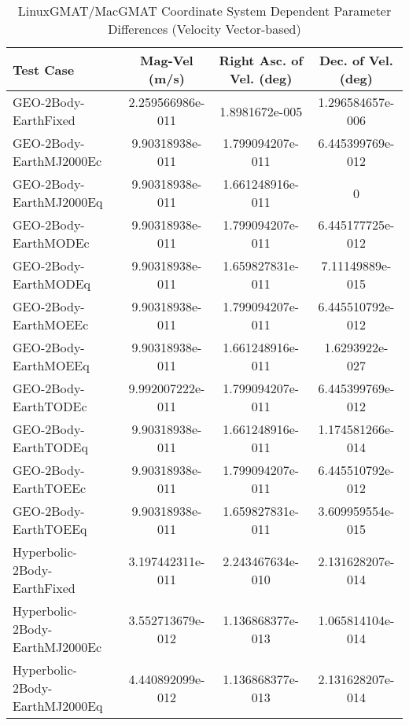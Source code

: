 \begin{table}[htbp!]
\centering
\caption{ LinuxGMAT/MacGMAT Coordinate System Dependent Parameter Differences (Velocity Vector-based)}
      \begin{tabular}{lccc}
      \hline\hline
          Test Case & Mag-Vel (m/s) & Right Asc. of Vel. (deg) & Dec. of Vel. (deg) \\
         \hline
         GEO-2Body-EarthFixed & 2.259566986e-011 & 1.8981672e-005 & 1.296584657e-006 \\
         GEO-2Body-EarthMJ2000Ec & 9.90318938e-011 & 1.799094207e-011 & 6.445399769e-012 \\
         GEO-2Body-EarthMJ2000Eq & 9.90318938e-011 & 1.661248916e-011 & 0 \\
         GEO-2Body-EarthMODEc & 9.90318938e-011 & 1.799094207e-011 & 6.445177725e-012 \\
         GEO-2Body-EarthMODEq & 9.90318938e-011 & 1.659827831e-011 & 7.11149889e-015 \\
         GEO-2Body-EarthMOEEc & 9.90318938e-011 & 1.799094207e-011 & 6.445510792e-012 \\
         GEO-2Body-EarthMOEEq & 9.90318938e-011 & 1.661248916e-011 & 1.6293922e-027 \\
         GEO-2Body-EarthTODEc & 9.992007222e-011 & 1.799094207e-011 & 6.445399769e-012 \\
         GEO-2Body-EarthTODEq & 9.90318938e-011 & 1.661248916e-011 & 1.174581266e-014 \\
         GEO-2Body-EarthTOEEc & 9.90318938e-011 & 1.799094207e-011 & 6.445510792e-012 \\
         GEO-2Body-EarthTOEEq & 9.90318938e-011 & 1.659827831e-011 & 3.609959554e-015 \\
         Hyperbolic-2Body-EarthFixed & 3.197442311e-011 & 2.243467634e-010 & 2.131628207e-014 \\
         Hyperbolic-2Body-EarthMJ2000Ec & 3.552713679e-012 & 1.136868377e-013 & 1.065814104e-014 \\
         Hyperbolic-2Body-EarthMJ2000Eq & 4.440892099e-012 & 1.136868377e-013 & 2.131628207e-014 \\

\end{tabular}
\end{table}
